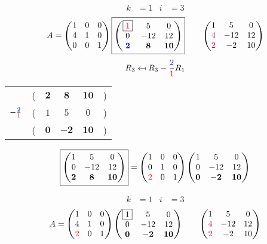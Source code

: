 \documentclass[pdf]{beamer}
\begin{document}
\begin{frame}{}\begin{align*} k &= 1 & i &= 3 \end{align*} $$A=\begin{pmatrix}1&0&0\\4&1&0\\0&0&1\end{pmatrix} \boxed{\begin{pmatrix}\boxed{{\color{red}1}}&5&0\\0&-12&12\\\mathbf{{\color{blue}2}}&\mathbf{8}&\mathbf{10}\end{pmatrix}} \quad\quad \begin{pmatrix}1&5&0\\{\color{purple}4}&-12&12\\{\color{purple}2}&-2&10\end{pmatrix}$$ $$R_3 \mapsfrom R_3 - \frac{{\color{blue}2}}{{\color{red}1}} R_1$$ \begin{center}\begin{tabular}{cccccc}  &(& $ \mathbf{2} $ & $ \mathbf{8} $ & $ \mathbf{10} $ &)\\$ -\frac{{\color{blue}2}}{{\color{red}1}} $&(& $ 1 $ & $ 5 $ & $ 0 $ &)\\\hline  &(& $ \mathbf{0} $ & $ \mathbf{-2} $ & $ \mathbf{10} $ &) \end{tabular}\end{center} $$ \boxed{\begin{pmatrix}1&5&0\\0&-12&12\\\mathbf{2}&\mathbf{8}&\mathbf{10}\end{pmatrix}} = \begin{pmatrix}1&0&0\\0&1&0\\{\color{red}2}&0&1\end{pmatrix} \begin{pmatrix}1&5&0\\0&-12&12\\\mathbf{0}&\mathbf{-2}&\mathbf{10}\end{pmatrix} $$\end{frame}
\begin{frame}{}\begin{align*} k &= 1 & i &= 3 \end{align*}$$A=\begin{pmatrix}1&0&0\\4&1&0\\{\color{red}2}&0&1\end{pmatrix} \begin{pmatrix}\boxed{1}&5&0\\0&-12&12\\\mathbf{0}&\mathbf{-2}&\mathbf{10}\end{pmatrix} \quad\quad \begin{pmatrix}1&5&0\\{\color{purple}4}&-12&12\\{\color{purple}2}&-2&10\end{pmatrix}$$\end{frame}
\end{document}
